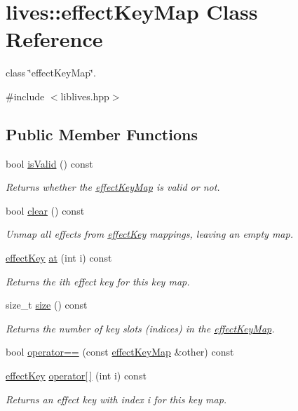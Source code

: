 \hypertarget{classlives_1_1effectKeyMap}{\section{lives\-:\-:effect\-Key\-Map Class Reference}
\label{classlives_1_1effectKeyMap}
}


class \char`\"{}effect\-Key\-Map\char`\"{}.  




{\ttfamily \#include $<$liblives.\-hpp$>$}

\subsection*{Public Member Functions}
\begin{DoxyCompactItemize}
\item 
bool \hyperlink{classlives_1_1effectKeyMap_a58a3827a33e56539e53b73153052cd99}{is\-Valid} () const 
\begin{DoxyCompactList}\small\item\em Returns whether the \hyperlink{classlives_1_1effectKeyMap}{effect\-Key\-Map} is valid or not. \end{DoxyCompactList}\item 
bool \hyperlink{classlives_1_1effectKeyMap_a09893bcee195b64316342b00b1dbeec9}{clear} () const 
\begin{DoxyCompactList}\small\item\em Unmap all effects from \hyperlink{classlives_1_1effectKey}{effect\-Key} mappings, leaving an empty map. \end{DoxyCompactList}\item 
\hyperlink{classlives_1_1effectKey}{effect\-Key} \hyperlink{classlives_1_1effectKeyMap_a9ebd88928ef0202d192c41886f98f433}{at} (int i) const 
\begin{DoxyCompactList}\small\item\em Returns the ith effect key for this key map. \end{DoxyCompactList}\item 
size\-\_\-t \hyperlink{classlives_1_1effectKeyMap_a2a9610e8cab2c3cb765ca23a4629af99}{size} () const 
\begin{DoxyCompactList}\small\item\em Returns the number of key slots (indices) in the \hyperlink{classlives_1_1effectKeyMap}{effect\-Key\-Map}. \end{DoxyCompactList}\item 
bool \hyperlink{classlives_1_1effectKeyMap_a2c211c5b282d1ba0cdbf81ba3854ddce}{operator==} (const \hyperlink{classlives_1_1effectKeyMap}{effect\-Key\-Map} \&other) const 
\item 
\hyperlink{classlives_1_1effectKey}{effect\-Key} \hyperlink{classlives_1_1effectKeyMap_a5a3516b5f5687083edc8179883933f61}{operator\mbox{[}$\,$\mbox{]}} (int i) const 
\begin{DoxyCompactList}\small\item\em Returns an effect key with index i for this key map. \end{DoxyCompactList}\end{DoxyCompactItemize}
